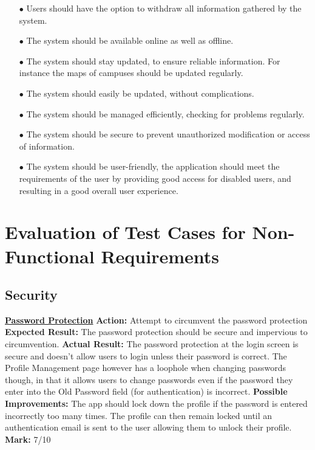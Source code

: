 \documentclass[english]{article}
\begin{document}
\begin{itemize}
\item[$\bullet$]Users should have the option to withdraw all information gathered by the system.

\item[$\bullet$]The system should be available online as well as offline.

\item[$\bullet$]The system should stay updated, to ensure reliable information. For instance the maps of campuses should be updated regularly.

\item[$\bullet$]The system should easily be updated, without complications.

\item[$\bullet$]The system should be managed efficiently, checking for problems regularly.

\item[$\bullet$]The system should be secure to prevent unauthorized modification or access of information.

\item[$\bullet$]The system should be user-friendly, the application should meet the requirements of the user by providing good access for disabled users, and resulting in a good overall user experience.
\end{itemize}	
	
	\section{Evaluation of Test Cases for Non-Functional Requirements}
	
\subsection{Security}\label{subsec:overall-security}
		    \textbf{\underline{Password Protection}}\newline
		    \textbf{Action:} Attempt to circumvent the password protection\newline
            \textbf{Expected Result:} The password protection should be secure and impervious to circumvention.\newline
            \textbf{Actual Result:} The password protection at the login screen is secure and doesn't allow users to login unless their password is correct. The Profile Management page however has a loophole when changing passwords though, in that it allows users to change passwords even if the password they enter into the Old Password field (for authentication) is incorrect.\newline
            \textbf{Possible Improvements:} The app should lock down the profile if the password is entered incorrectly too many times. The profile can then remain locked until an authentication email is sent to the user allowing them to unlock their profile. \newline
            \textbf{Mark:} 7/10\newline
            
\end{document}
